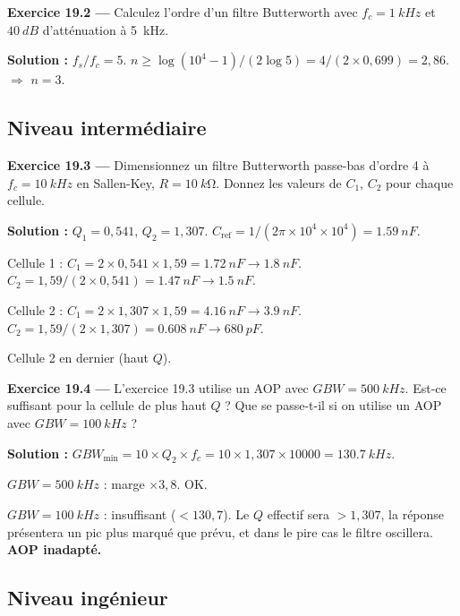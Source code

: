 \documentclass[12pt,a4paper,twoside]{book}
\begin{document}
\textbf{Exercice 19.2 ---} Calculez l'ordre d'un filtre Butterworth avec $f_c = \SI{1}{kHz}$ et $\SI{40}{dB}$ d'atténuation à \SI{5}{kHz}.

\begin{pratique}
\textbf{Solution :} $f_s/f_c = 5$. $n \geq \log(10^4-1)/(2\log5) = 4/(2\times0{,}699) = 2{,}86$. $\Rightarrow$ $n = 3$.
\end{pratique}

\subsection*{Niveau intermédiaire}

\textbf{Exercice 19.3 ---} Dimensionnez un filtre Butterworth passe-bas d'ordre 4 à $f_c = \SI{10}{kHz}$ en Sallen-Key, $R = \SI{10}{k\ohm}$. Donnez les valeurs de $C_1$, $C_2$ pour chaque cellule.

\begin{pratique}
\textbf{Solution :} $Q_1 = 0{,}541$, $Q_2 = 1{,}307$. $C_{\text{ref}} = 1/(2\pi\times10^4\times10^4) = \SI{1.59}{nF}$.

Cellule 1 : $C_1 = 2\times0{,}541\times1{,}59 = \SI{1.72}{nF} \to \SI{1.8}{nF}$. $C_2 = 1{,}59/(2\times0{,}541) = \SI{1.47}{nF} \to \SI{1.5}{nF}$.

Cellule 2 : $C_1 = 2\times1{,}307\times1{,}59 = \SI{4.16}{nF} \to \SI{3.9}{nF}$. $C_2 = 1{,}59/(2\times1{,}307) = \SI{0.608}{nF} \to \SI{680}{pF}$.

Cellule 2 en dernier (haut $Q$).
\end{pratique}

\textbf{Exercice 19.4 ---} L'exercice 19.3 utilise un AOP avec $GBW = \SI{500}{kHz}$. Est-ce suffisant pour la cellule de plus haut $Q$ ? Que se passe-t-il si on utilise un AOP avec $GBW = \SI{100}{kHz}$ ?

\begin{pratique}
\textbf{Solution :} $GBW_{\min} = 10\times Q_2\times f_c = 10\times1{,}307\times10000 = \SI{130.7}{kHz}$.

$GBW = \SI{500}{kHz}$ : marge $\times 3{,}8$. OK.

$GBW = \SI{100}{kHz}$ : insuffisant ($< 130{,}7$). Le $Q$ effectif sera $> 1{,}307$, la réponse présentera un pic plus marqué que prévu, et dans le pire cas le filtre oscillera. \textbf{AOP inadapté.}
\end{pratique}

\subsection*{Niveau ingénieur}
\end{document}
